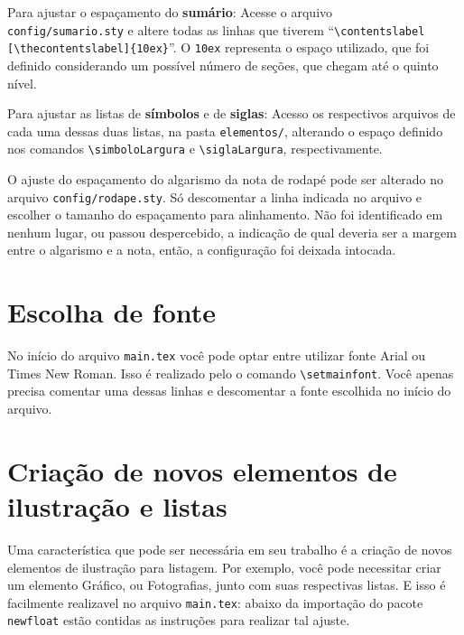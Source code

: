 Para ajustar o espaçamento do \textbf{sumário}: Acesse o arquivo \\\texttt{config/sumario.sty} e altere todas as linhas que tiverem ``\verb|\contentslabel|\\\verb|[\thecontentslabel]{10ex}|''. O \texttt{10ex} representa o espaço utilizado, que foi definido considerando um possível número de seções, que chegam até o quinto nível.

Para ajustar as listas de \textbf{símbolos} e de \textbf{siglas}: Acesso os respectivos arquivos de cada uma dessas duas listas, na pasta \texttt{elementos/}, alterando o espaço definido nos comandos \verb|\simboloLargura| e \verb|\siglaLargura|, respectivamente.

O ajuste do espaçamento do algarismo da nota de rodapé pode ser alterado no arquivo \texttt{config/rodape.sty}. Só descomentar a linha indicada no arquivo e escolher o tamanho do espaçamento para alinhamento. Não foi identificado em nenhum lugar, ou passou despercebido, a indicação de qual deveria ser a margem entre o algarismo e a nota, então, a configuração foi deixada intocada.

\section{Escolha de fonte}
No início do arquivo \texttt{main.tex} você pode optar entre utilizar fonte Arial ou Times New Roman. Isso é realizado pelo o comando \verb|\setmainfont|. Você apenas precisa comentar uma dessas linhas e descomentar a fonte escolhida no início do arquivo.

\section{Criação de novos elementos de ilustração e listas}
Uma característica que pode ser necessária em seu trabalho é a criação de novos elementos de ilustração para listagem. Por exemplo, você pode necessitar criar um elemento Gráfico, ou Fotografias, junto com suas respectivas listas. E isso é facilmente realizavel no arquivo \texttt{main.tex}: abaixo da importação do pacote \texttt{newfloat} estão contidas as instruções para realizar tal ajuste.


